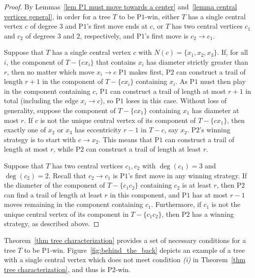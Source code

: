 \documentclass{article}
\theoremstyle{plain}
\theoremstyle{definition}
\def\pone{{\rm{P}\ensuremath{1}}}
\def\ptwo{{\rm{P}\ensuremath{2}}}
\def\poneposs{{\rm{P}\ensuremath{1}'s}}
\def\ptwoposs{{\rm{P}\ensuremath{2}'s}}
\begin{document}
\begin{proof}
    By Lemmas~\ref{lem P1 must move towards a center} and~\ref{lemma central vertices general}, in order for a tree $T$ to be \pone{}-win, either $T$ has a single central vertex $c$ of degree $3$ and \poneposs{} first move ends at $c$, or $T$ has two central vertices $c_1$ and $c_2$ of degrees $3$ and $2$, respectively, and \poneposs{} first move is $c_2 \to c_1$.

    Suppose that $T$ has a single central vertex $c$ with $N(c) = \{x_1, x_2, x_3\}$.
    If, for all $i$, the component of $T - \{cx_i\}$ that contains $x_i$ has diameter strictly greater than $r$, then no matter which move $x_i \to c$  \pone{} makes first, \ptwo{} can construct a trail of length $r + 1$ in the component of $T-\{cx_i\}$ containing $x_i$. As \pone{} must then play in the component containing $c$, \pone{} can construct a trail of length at most $r + 1$ in total (including the edge $x_i\to c$), so \pone{} loses in this case. 
    Without loss of generality, suppose the component of $T - \{cx_1\}$ containing $x_1$ has diameter at most $r$.
    If $c$ is not the unique central vertex of its component of $T - \{cx_1\}$, then exactly one of $x_2$ or $x_3$ has eccentricity $r-1$ in $T-c$, say $x_2$. \ptwoposs{} winning strategy is to start with $c \to x_2$. This means that \pone{} can construct a trail of length at most $r$, while \ptwo{} can construct a trail of length at least $r$.

    Suppose that $T$ has two central vertices $c_1, c_2$ with $\deg(c_1) = 3$ and $\deg(c_2) = 2$.
    Recall that $c_2 \to c_1$ is \poneposs{} first move in any winning strategy.
    If the diameter of the component of $T - \{c_1c_2\}$ containing $c_2$ is at least $r$, then \ptwo{} can find a trail of length at least $r$ in this component, and \pone{} has at most $r - 1$ moves remaining in the component containing $c_1$.
    Furthermore, if $c_1$ is not the unique central vertex of its component in $T - \{c_1c_2\}$, then \ptwo{} has a winning strategy, as described above.
\end{proof}


Theorem~\ref{thm tree characterization} provides a set of necessary conditions for a tree $T$ to be \pone{}-win.
Figure~\ref{fig:behind_the_back} depicts an example of a tree with a single central vertex which does not meet condition {\em (i)} in Theorem~\ref{thm tree characterization}, and thus is \ptwo{}-win. 
\end{document}
